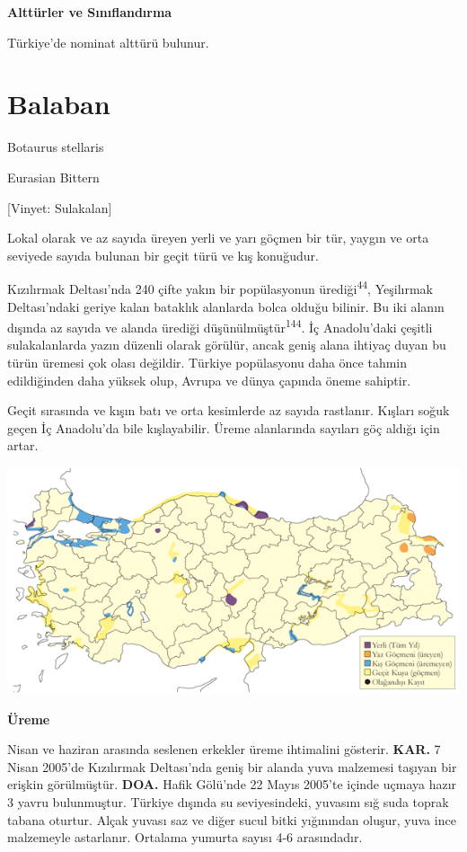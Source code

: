 \documentclass[
  letterpaper,
  DIV=11,
  numbers=noendperiod]{scrreprt}
\begin{document}
\textbf{Alttürler ve Sınıflandırma}

Türkiye'de nominat alttürü bulunur.

\section{Balaban}\label{balaban}

Botaurus stellaris

Eurasian Bittern

{[}Vinyet: Sulakalan{]}

Lokal olarak ve az sayıda üreyen yerli ve yarı göçmen bir tür, yaygın ve
orta seviyede sayıda bulunan bir geçit türü ve kış konuğudur.

Kızılırmak Deltası'nda 240 çifte yakın bir popülasyonun
ürediği\textsuperscript{44}, Yeşilırmak Deltası'ndaki geriye kalan
bataklık alanlarda bolca olduğu bilinir. Bu iki alanın dışında az sayıda
ve alanda ürediği düşünülmüştür\textsuperscript{144}. İç Anadolu'daki
çeşitli sulakalanlarda yazın düzenli olarak görülür, ancak geniş alana
ihtiyaç duyan bu türün üremesi çok olası değildir. Türkiye popülasyonu
daha önce tahmin edildiğinden daha yüksek olup, Avrupa ve dünya çapında
öneme sahiptir.

Geçit sırasında ve kışın batı ve orta kesimlerde az sayıda rastlanır.
Kışları soğuk geçen İç Anadolu'da bile kışlayabilir. Üreme alanlarında
sayıları göç aldığı için artar.

\includegraphics{images/harita_Page_064.png}

\textbf{Üreme}

Nisan ve haziran arasında seslenen erkekler üreme ihtimalini gösterir.
\textbf{KAR.} 7 Nisan 2005'de Kızılırmak Deltası'nda geniş bir alanda
yuva malzemesi taşıyan bir erişkin görülmüştür. \textbf{DOA.} Hafik
Gölü'nde 22 Mayıs 2005'te içinde uçmaya hazır 3 yavru bulunmuştur.
Türkiye dışında su seviyesindeki, yuvasını sığ suda toprak tabana
oturtur. Alçak yuvası saz ve diğer sucul bitki yığınından oluşur, yuva
ince malzemeyle astarlanır. Ortalama yumurta sayısı 4-6 arasındadır.
\end{document}
